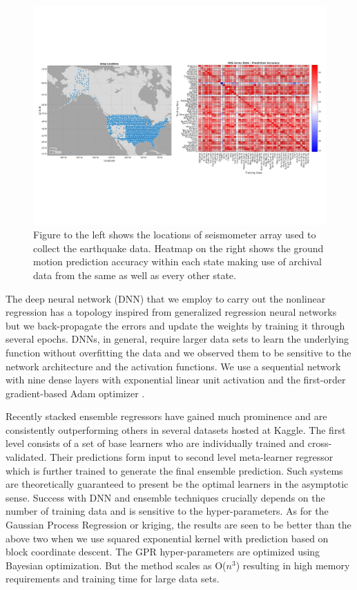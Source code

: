 \documentclass[twocolumn, aps, superscriptaddress]{revtex4}
\begin{document}
\begin{figure}[!htb]
 \includegraphics[width=\textwidth]{./plots/USArray_with_HeatMap}
 \caption{Figure to the left shows the locations of seismometer array used to collect the earthquake data. Heatmap on the right shows the ground motion prediction accuracy within each state making use of archival data from the same as well as every other state.}
 \label{fig:map}
\end{figure}


The deep neural network (DNN) that we employ to carry out the nonlinear regression has a topology inspired from generalized regression neural networks\cite{specht1991general} but we back-propagate the errors and update the weights by training it through several epochs.   DNNs, in general, require larger data sets to learn the underlying function without overfitting the data and we observed them to be sensitive to the network architecture and the activation functions. We use a sequential network with nine dense layers with exponential linear unit activation and the first-order gradient-based Adam optimizer \cite{kingma2014adam}.

Recently stacked ensemble regressors have gained much prominence and are consistently outperforming others in several datasets hosted at Kaggle\cite{Kaggle}. The first level consists of a set of base learners who are individually trained and cross-validated. Their predictions form input to second level meta-learner regressor which is further trained to generate the final ensemble prediction.  Such systems are theoretically guaranteed to present be the optimal learners in the asymptotic sense. Success with DNN and ensemble techniques crucially depends on the number of training data and is sensitive to the hyper-parameters. As for the Gaussian Process Regression or kriging, the results are seen to be better than the above two when we use squared exponential kernel with prediction based on block coordinate descent. The GPR hyper-parameters are optimized using Bayesian optimization. But the method scales as O($n^3$) resulting in high memory requirements and training time for large data sets.
\end{document}
